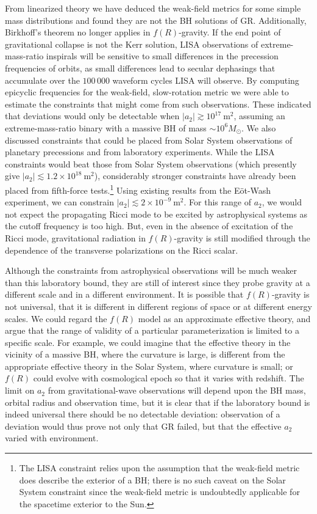 \documentclass[aps,prd,amsfonts,amssymb,amsmath,nofootinbib,reprint,showpacs]{revtex4-1}
\newcommand{\units}[1]{\ensuremath{~\mathrm{#1}}}
\begin{document}
From linearized theory we have deduced the weak-field metrics for some simple mass distributions and found they are not the BH solutions of GR. Additionally, Birkhoff's theorem no longer applies in $f(R)$-gravity. If the end point of gravitational collapse is not the Kerr solution, LISA observations of extreme-mass-ratio inspirals will be sensitive to small differences in the precession frequencies of orbits, as small differences lead to secular dephasings that accumulate over the $100\,000$ waveform cycles LISA will observe. By computing epicyclic frequencies for the weak-field, slow-rotation metric we were able to estimate the constraints that might come from such observations. These indicated that deviations would only be detectable when $|a_2| \gtrsim 10^{17}\units{m^2}$, assuming an extreme-mass-ratio binary with a massive BH of mass $\sim 10^6 M_\odot$. We also discussed constraints that could be placed from Solar System observations of planetary precessions and from laboratory experiments. While the LISA constraints would beat those from Solar System observations (which presently give $|a_2| \lesssim 1.2 \times 10^{18}\units{m^2}$), considerably stronger constraints have already been placed from fifth-force tests.\footnote{The LISA constraint relies upon the assumption that the weak-field metric does describe the exterior of a BH; there is no such caveat on the Solar System constraint since the weak-field metric is undoubtedly applicable for the spacetime exterior to the Sun.} Using existing results from the E\"ot-Wash experiment, we can constrain $|a_2| \lesssim 2 \times 10^{-9}\units{m^2}$. For this range of $a_2$, we would not expect the propagating Ricci mode to be excited by astrophysical systems as the cutoff frequency is too high. But, even in the absence of excitation of the Ricci mode, gravitational radiation in $f(R)$-gravity is still modified through the dependence of the transverse polarizations on the Ricci scalar. 

Although the constraints from astrophysical observations will be much weaker than this laboratory bound, they are still of interest since they probe gravity at a different scale and in a different environment. It is possible that $f(R)$-gravity is not universal, that it is different in different regions of space or at different energy scales. We could regard the $f(R)$ model as an approximate effective theory, and argue that the range of validity of a particular parameterization is limited to a specific scale. For example, we could imagine that the effective theory in the vicinity of a massive BH, where the curvature is large, is different from the appropriate effective theory in the Solar System, where curvature is small; or $f(R)$ could evolve with cosmological epoch so that it varies with redshift. The limit on $a_2$ from gravitational-wave observations will depend upon the BH mass, orbital radius and observation time, but it is clear that if the laboratory bound is indeed universal there should be no detectable deviation: observation of a deviation would thus prove not only that GR failed, but that the effective $a_2$ varied with environment.
\end{document}

